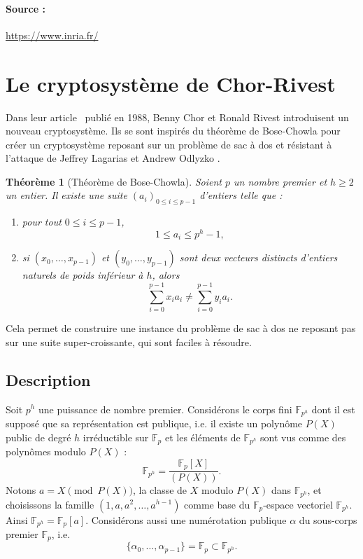\documentclass[a4paper, titlepage, 11pt]{article}
\newtheorem{theo}{Théorème}[section]
\theoremstyle{definition}
\theoremstyle{remark}
\def\gf #1{\mathbb{F}_{#1}}
\begin{document}
\paragraph*{Source :} \url{https://www.inria.fr/}

\section{Le cryptosystème de Chor-Rivest}\label{sec:cryptosysteme}

Dans leur article~\cite{chorRivest1988} publié en 1988, Benny Chor et Ronald Rivest introduisent un nouveau cryptosystème. Ils se sont inspirés du théorème de Bose-Chowla \cite{bose1962} pour créer un cryptosystème reposant sur un problème de sac à dos et résistant à l'attaque de Jeffrey Lagarias et Andrew Odlyzko \cite{lagarias1983}.
\begin{theo}[Théorème de Bose-Chowla]
Soient $p$ un nombre premier et $h \geqslant 2$ un entier. Il existe une suite ${(a_i)}_{0\leqslant i \leqslant p-1}$ d'entiers telle que : \begin{enumerate}
\item pour tout $0 \leqslant i \leqslant p-1$, $$1 \leqslant a_i \leqslant p^h-1,$$
\item si $(x_0, \dots, x_{p-1})$ et $(y_0, \dots, y_{p-1})$ sont deux vecteurs distincts d'entiers naturels de poids inférieur à $h$, alors
$$\sum_{i=0}^{p-1} x_ia_i \neq \sum_{i=0}^{p-1} y_ia_i.$$
\end{enumerate}
\end{theo}

Cela permet de construire une instance du problème de sac à dos ne reposant pas sur une suite super-croissante, qui sont faciles à résoudre.

\subsection{Description}

Soit $p^h$ une puissance de nombre premier. Considérons le corps fini $\gf{p^h}$ dont il est supposé que sa représentation est publique, i.e. il existe un polynôme $P(X)$ public de degré $h$ irréductible sur $\gf{p}$ et les éléments de $\gf{p^h}$ sont vus comme des polynômes modulo $P(X)$ :
$$\gf{p^h} = \frac{\gf{p}[X]}{(P(X))}.$$
Notons $a = X \pmod{P(X)}$, la classe de $X$ modulo $P(X)$ dans $\gf{p^h}$, et choisissons la famille $(1, a, a^2, \dots, a^{h-1})$ comme base du $\gf{p}$-espace vectoriel $\gf{p^h}$. Ainsi $\gf{p^h} = \gf{p}[a]$. Considérons aussi une numérotation publique $\alpha$ du sous-corps premier $\gf{p}$, i.e. $$\{\alpha_0,\dots, \alpha_{p-1}\} = \gf{p} \subset \gf{p^h}.$$
\end{document}

